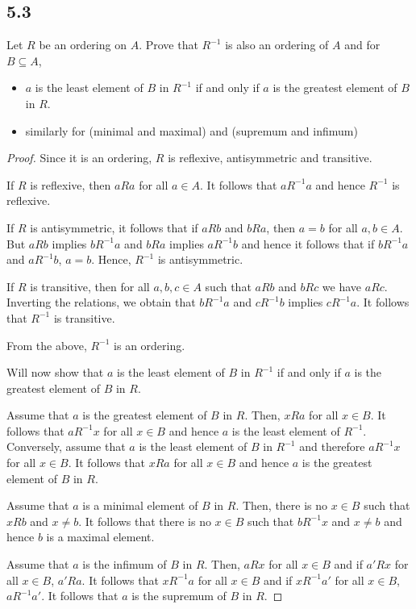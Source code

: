 \subsection*{5.3} Let $R$ be an ordering on $A$. Prove that $R^{-1}$ is also an ordering of $A$ and for $B \subseteq A$,

\begin{itemize}
    \item $a$ is the least element of $B$ in $R^{-1}$ if and only if $a$ is the greatest element of $B$ in $R$.
    \item similarly for (minimal and maximal) and (supremum and infimum)
\end{itemize}

\begin{proof}
    Since it is an ordering, $R$ is reflexive, antisymmetric and transitive.
    
    If $R$ is reflexive, then $aRa$ for all $a \in A$. It follows that $aR^{-1}a$ and hence $R^{-1}$ is reflexive.
    
    If $R$ is antisymmetric, it follows that if $aRb$ and $bRa$, then $a=b$ for all $a,b \in A$. But $aRb$ implies $bR^{-1}a$ and $bRa$ implies $aR^{-1}b$ and hence it follows that if $bR^{-1}a$ and $aR^{-1}b$, $a=b$. Hence, $R^{-1}$ is antisymmetric.
    
    If $R$ is transitive, then for all $a,b,c \in A$ such that $aRb$ and $bRc$ we have $aRc$. Inverting the relations, we obtain that $bR^{-1}a$ and $cR^{-1}b$ implies $cR^{-1}a$. It follows that $R^{-1}$ is transitive.
    
    From the above, $R^{-1}$ is an ordering.
    
    \vspace{2em}
    
    Will now show that $a$ is the least element of $B$ in $R^{-1}$ if and only if $a$ is the greatest element of $B$ in $R$.
    
    Assume that $a$ is the greatest element of $B$ in $R$. Then, $xRa$ for all $x \in B$. It follows that $aR^{-1}x$ for all $x \in B$ and hence $a$ is the least element of $R^{-1}$. Conversely, assume that $a$ is the least element of $B$ in $R^{-1}$ and therefore $aR^{-1}x$ for all $x \in B$. It follows that $xRa$ for all $x \in B$ and hence $a$ is the greatest element of $B$ in $R$.
    
    \vspace{2em}
    
    Assume that $a$ is a minimal element of $B$ in $R$. Then, there is no $x \in B$ such that $xRb$ and $x \neq b$. It follows that there is no $x \in B$ such that $bR^{-1}x$ and $x \neq b$ and hence $b$ is a maximal element.
    
    \vspace{2em}
    
    Assume that $a$ is the infimum of $B$ in $R$. Then, $aRx$ for all $x \in B$ and if $a'Rx$ for all $x \in B$, $a'Ra$. It follows that $xR^{-1}a$ for all $x \in B$ and if $xR^{-1}a'$ for all $x \in B$, $aR^{-1}a'$. It follows that $a$ is the supremum of $B$ in $R$.
    
\end{proof}

\newpage

